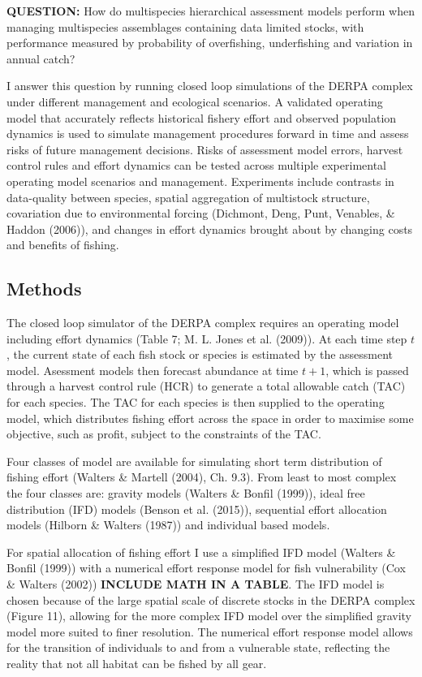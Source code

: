 \documentclass[12pt,]{scrartcl}
\begin{document}
\textbf{QUESTION:} How do multispecies hierarchical assessment models
perform when managing multispecies assemblages containing data limited
stocks, with performance measured by probability of overfishing,
underfishing and variation in annual catch?

I answer this question by running closed loop simulations of the DERPA
complex under different management and ecological scenarios. A validated
operating model that accurately reflects historical fishery effort and
observed population dynamics is used to simulate management procedures
forward in time and assess risks of future management decisions. Risks
of assessment model errors, harvest control rules and effort dynamics
can be tested across multiple experimental operating model scenarios and
management. Experiments include contrasts in data-quality between
species, spatial aggregation of multistock structure, covariation due to
environmental forcing (Dichmont, Deng, Punt, Venables, \& Haddon
(2006)), and changes in effort dynamics brought about by changing costs
and benefits of fishing.

\subsection{Methods}\label{methods-2}

The closed loop simulator of the DERPA complex requires an operating
model including effort dynamics (Table 7; M. L. Jones et al. (2009)). At
each time step \(t\), the current state of each fish stock or species is
estimated by the assessment model. Asessment models then forecast
abundance at time \(t+1\), which is passed through a harvest control
rule (HCR) to generate a total allowable catch (TAC) for each species.
The TAC for each species is then supplied to the operating model, which
distributes fishing effort across the space in order to maximise some
objective, such as profit, subject to the constraints of the TAC.

Four classes of model are available for simulating short term
distribution of fishing effort (Walters \& Martell (2004), Ch. 9.3).
From least to most complex the four classes are: gravity models (Walters
\& Bonfil (1999)), ideal free distribution (IFD) models (Benson et al.
(2015)), sequential effort allocation models (Hilborn \& Walters (1987))
and individual based models.

For spatial allocation of fishing effort I use a simplified IFD model
(Walters \& Bonfil (1999)) with a numerical effort response model for
fish vulnerability (Cox \& Walters (2002)) \textbf{INCLUDE MATH IN A
TABLE}. The IFD model is chosen because of the large spatial scale of
discrete stocks in the DERPA complex (Figure 11), allowing for the more
complex IFD model over the simplified gravity model more suited to finer
resolution. The numerical effort response model allows for the
transition of individuals to and from a vulnerable state, reflecting the
reality that not all habitat can be fished by all gear.
\end{document}
